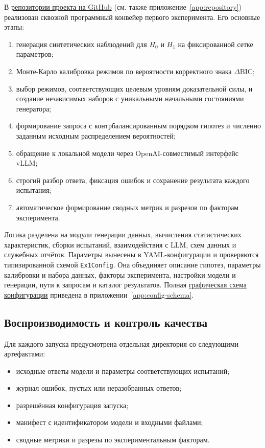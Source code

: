 \documentclass[a4paper,14pt]{extarticle}
\newcommand{\Hnull}{\ensuremath{H_0}}
\newcommand{\Hone}{\ensuremath{H_1}}
\newcommand{\DeltaBIC}{\ensuremath{\Delta\mathrm{BIC}}}
\newcommand{\code}[1]{\texttt{#1}}
\begin{document}
В \href{https://github.com/drema3-4/Master-thesis.git}{репозитории проекта на GitHub} (см. также приложение~\ref{app:repository}) реализован сквозной программный конвейер первого эксперимента. Его основные этапы:

\begin{enumerate}
  \item генерация синтетических наблюдений для \Hnull{} и \Hone{} на фиксированной сетке параметров;
  \item Монте-Карло калибровка режимов по вероятности корректного знака \DeltaBIC;
  \item выбор режимов, соответствующих целевым уровням доказательной силы, и создание независимых наборов с уникальными начальными состояниями генератора;
  \item формирование запроса с контрбалансированным порядком гипотез и численно заданным исходным распределением вероятностей;
  \item обращение к локальной модели через OpenAI-совместимый интерфейс vLLM;
  \item строгий разбор ответа, фиксация ошибок и сохранение результата каждого испытания;
  \item автоматическое формирование сводных метрик и разрезов по факторам эксперимента.
\end{enumerate}

Логика разделена на модули генерации данных, вычисления статистических характеристик, сборки испытаний, взаимодействия с LLM, схем данных и служебных отчётов. Параметры вынесены в YAML-конфигурации и проверяются типизированной схемой \code{Ex1Config}. Она объединяет описание гипотез, параметры калибровки и набора данных, факторы эксперимента, настройки модели и генерации, пути к запросам и каталог результатов. Полная \hyperref[fig:config-schema]{графическая схема конфигурации} приведена в приложении~\ref{app:config-schema}.

\subsection{Воспроизводимость и контроль качества}

Для каждого запуска предусмотрена отдельная директория со следующими артефактами:

\begin{itemize}
  \item исходные ответы модели и параметры соответствующих испытаний;
  \item журнал ошибок, пустых или неразобранных ответов;
  \item разрешённая конфигурация запуска;
  \item манифест с идентификатором модели и входными файлами;
  \item сводные метрики и разрезы по экспериментальным факторам.
\end{itemize}
\end{document}
